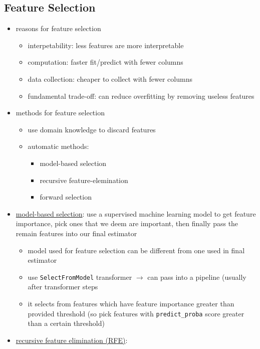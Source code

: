 \documentclass[10.5pt,a4paper, fleqn, dvipsnames]{article}
\begin{document}
\subsection*{Feature Selection}
\begin{itemize}
    \item reasons for feature selection
    \begin{itemize}
        \item interpetability: less features are more interpretable 
        \item computation: faster fit/predict with fewer columns
        \item data collection: cheaper to collect with fewer columns
        \item fundamental trade-off: can reduce overfitting by removing useless features 
    \end{itemize}
    \item methods for feature selection
    \begin{itemize}
        \item use domain knowledge to discard features
        \item automatic methods: 
        \begin{itemize}[leftmargin = 2em]
            \item model-based selection
            \item recursive feature-elemination
            \item forward selection
        \end{itemize}
    \end{itemize}
    \item \ul{model-based selection}: use a supervised machine learning model to get feature importance, pick ones that we deem are important, then finally pass the remain features into our final estimator 
    \begin{itemize}
        \item model used for feature selection can be different from one used in final estimator 
        \item use \lstinline{SelectFromModel} transformer $\rightarrow$ can pass into a pipeline (usually after transformer steps
        \item it selects from features which have feature importance greater than provided threshold (so pick features with \lstinline{predict_proba} score greater than a certain threshold)
    \end{itemize}
    \item \ul{recursive feature elimination (RFE)}:

\end{itemize}
\end{document}

